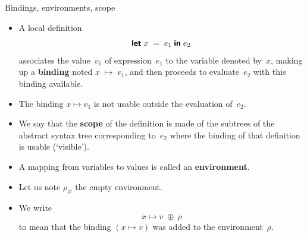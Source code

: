 \documentclass[compress,dvipdfmx]{beamer}
\newcommand{\OCaml}{\textsf{OCaml}\xspace}
\begin{document}
%
\begin{frame}{Bindings, environments, scope}

  \begin{itemize}

    \item A local definition
      \begin{equation*}
        \textsf{\textbf{let}} \; x \; = \; e_1 \; \textsf{\textbf{in}} \; e_2
      \end{equation*}
      associates the value~\(v_1\) of expression~\(e_1\) to the
      variable denoted by~\(x\), making up a \textbf{binding} noted
      \(x \; \mapsto \; v_1\), and then proceeds to evaluate~\(e_2\)
      with this binding available.

    \item The binding \(x \mapsto v_1\) is not usable
      outside the evaluation of~\(e_2\).

    \item We say that the \textbf{scope} of the definition is made of
      the subtrees of the abstract syntax tree corresponding
      to~\(e_2\) where the binding of that definition is usable
      (`visible').

    \item A mapping from variables to values is called an
      \textbf{environment}.

    \item Let us note \(\rho_\varnothing\) the empty environment.

    \item We write
      \begin{equation*}
        x \mapsto v \; \oplus \ \rho
      \end{equation*}
      to mean that the binding \((x \mapsto v)\) was added to the
      environment~\(\rho\).




  \end{itemize}

\end{frame}
\end{document}
